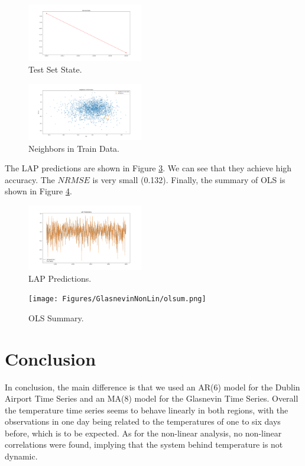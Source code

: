 \documentclass[conference]{IEEEtran}
\begin{document}
\begin{figure}[ht]
    \centering
    \includegraphics[width=0.45\textwidth]{Figures/GlasnevinNonLin/Test Set State.png}
    \caption{Test Set State.}
    \label{TESTg}
\end{figure}
\vspace{80mm}

\begin{figure}[ht]
    \centering
    \includegraphics[width=0.45\textwidth]{Figures/GlasnevinNonLin/Neighbors in Train Data.png}
    \caption{Neighbors in Train Data.}
    \label{traing}
\end{figure}

The LAP predictions are shown in Figure \ref{lapg}. We can see that they achieve high accuracy. The $NRMSE$ is very small (0.132). Finally, the summary of OLS is shown in Figure \ref{tablg}. 
\vspace{80mm}

\begin{figure}[ht]
    \centering
    \includegraphics[width=0.45\textwidth]{Figures/GlasnevinNonLin/LAP Predictions.png}
    \caption{LAP Predictions.}
    \label{lapg}
\end{figure}

\begin{figure}[ht]
    \centering
    \texttt{[image: Figures/GlasnevinNonLin/olsum.png]}
    \caption{OLS Summary.}
    \label{tablg}
\end{figure}

\section{Conclusion}

In conclusion, the main difference is that we used an AR(6) model for the Dublin Airport Time Series and an MA(8) model for the Glasnevin Time Series. Overall the temperature time series seems to behave linearly in both regions, with the observations in one day being related to the temperatures of one to six days before, which is to be expected. As for the non-linear analysis, no non-linear correlations were found, implying that the system behind temperature is not dynamic.
\end{document}
